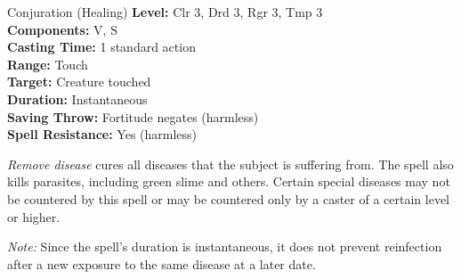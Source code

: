 {Conjuration (Healing)}
{
	\textbf{Level:}
	Clr 3, Drd 3, Rgr 3, Tmp 3\\
	\textbf{Components:}
	V, S\\
	\textbf{Casting Time:}
	1 standard action\\
	\textbf{Range:}
	Touch\\
	\textbf{Target:}
	Creature touched\\
	\textbf{Duration:}
	Instantaneous\\
	\textbf{Saving Throw:}
	Fortitude negates (harmless)\\
	\textbf{Spell Resistance:}
	Yes (harmless)\\
}
{
	\emph{Remove disease} cures all diseases that the subject is suffering from. The spell also kills parasites, including green slime and others. Certain special diseases may not be countered by this spell or may be countered only by a caster of a certain level or higher.

	\textit{Note:} Since the spell's duration is instantaneous, it does not prevent reinfection after a new exposure to the same disease at a later date.

}
